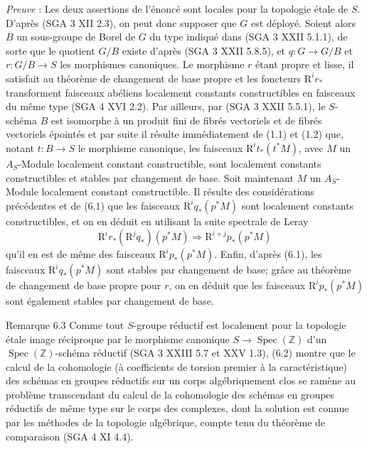 \emph{Preuve} : Les deux assertions de l'énoncé sont locales pour la topologie étale de $S$. D'après (SGA 3 XII 2.3), on peut donc supposer que $G$ est déployé. Soient alors $B$ un sous-groupe de Borel de $G$ du type indiqué dans (SGA 3 XXII 5.1.1), de sorte que le quotient $G/B$ existe d'après (SGA 3 XXII 5.8.5), et $q:G\to G/B$ et $r:G/B\to S$ les morphismes canoniques. Le morphisme $r$ étant propre et lisse, il satisfait au théorème de changement de base propre et les foncteurs $\mathrm{R}^ir_*$ transforment faisceaux abéliens localement constants constructibles en faisceaux du même type (SGA 4 XVI 2.2). Par ailleurs, par (SGA 3 XXII 5.5.1), le $S$-schéma $B$ est isomorphe à un produit fini de fibrés vectoriels et de fibrés vectoriels épointés et par
suite il résulte immédiatement de (1.1) et (1.2) que, notant $t:B\to S$ le morphisme canonique, les 
faisceaux $\mathrm{R}^it_*(t^*M)$, avec $M$ un $A_S$-Module localement constant constructible, sont localement constants constructibles et stables par changement de base. Soit maintenant $M$ un $A_S$-Module localement constant constructible. Il résulte des considérations précédentes et de (6.1) que les faisceaux $\mathrm{R}^iq_*(p^*M)$ sont localement constants constructibles, et on en déduit en utilisant la suite spectrale de Leray
\[
\mathrm{R}^ir_*(\mathrm{R}^jq_*)(p^*M)\Rightarrow \mathrm{R}^{i+j}p_*(p^*M)
\]
qu'il en est de même des faisceaux $\mathrm{R}^ip_*(p^*M)$. Enfin, d'après (6.1), les faisceaux $\mathrm{R}^iq_*(p^*M)$ sont stables par changement de base; grâce au théorème de changement de base propre pour $r$, on en déduit que les faisceaux $\mathrm{R}^ip_*(p^*M)$ sont également stables par changement de base.

\begin{statement}{Remarque 6.3}
Comme tout $S$-groupe réductif est localement pour la topologie étale image réciproque par le morphisme canonique $S\to\operatorname{Spec}(\mathbb{Z})$ d'un $\operatorname{Spec}(\mathbb{Z})$-schéma réductif (SGA 3 XXIII 5.7 et XXV 1.3), (6.2) montre que le calcul de la cohomologie (à coefficients de torsion premier à la caractéristique) des schémas en groupes réductifs sur un corps algébriquement clos se ramène au problème transcendant du calcul de la cohomologie des schémas en groupes réductifs de même type sur le corps des complexes, dont la solution est connue par les méthodes de la topologie algébrique, compte tenu du théorème de comparaison (SGA 4 XI 4.4).
\end{statement}

